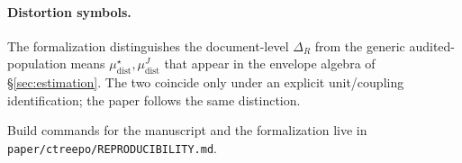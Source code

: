 \paragraph{Distortion symbols.} The formalization distinguishes the
document-level $\Delta_R$ from the generic audited-population means
$\mu_{\mathrm{dist}}^\star,\mu_{\mathrm{dist}}^J$ that appear in the
envelope algebra of \S\ref{sec:estimation}. The two coincide only under
an explicit unit/coupling identification; the paper follows the same
distinction.

Build commands for the manuscript and the formalization live in
\texttt{paper/ctreepo/REPRODUCIBILITY.md}.
